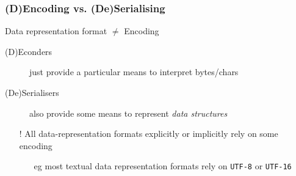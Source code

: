 \documentclass[presentation]{beamer}\mode<presentation>{\usetheme{AMSBolognaFC}}
\begin{document}
\begin{frame}[allowframebreaks]
\frametitle{(D)Encoding vs. (De)Serialising}

    \begin{block}{Data representation format $\neq$ Encoding}
        \begin{description}
            \item[(D)Econders] just provide a particular means to interpret bytes/chars
            \item[(De)Serialisers] also provide some means to represent \emph{data structures}
        \end{description}
        \begin{itemize}
            \item[!] All data-representation formats explicitly or implicitly rely on some encoding
            \begin{itemize}
                \item[eg] most textual data representation formats rely on \texttt{UTF-8} or \texttt{UTF-16}
            \end{itemize}
        \end{itemize}
    \end{block}

\end{frame}
\end{document}
